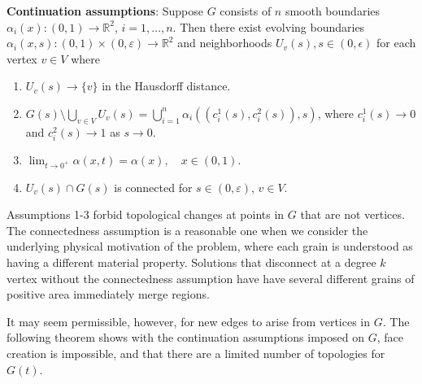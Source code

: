  \textbf{Continuation assumptions}: Suppose $G$ consists of $n$ smooth boundaries  $\alpha_{i}(x):(0,1) \rightarrow \mathbb{R}^2$, $i = 1, \dots, n$. Then   there exist evolving boundaries $\alpha_i(x,s):(0,1)\times (0,\varepsilon)\rightarrow \mathbb R^2$ and neighborhoods $U_v(s), s\in (0,\epsilon)  $ for each vertex  $v \in V$ where 
\begin{enumerate}
\item $U_v(s) \rightarrow \{v\}$ in the Hausdorff distance.
\item $G(s) \setminus \bigcup_{v\in V} U_v(s)= \bigcup_{i = 1}^n \alpha_i((c_i^1(s),c_i^2(s)),s)$, where $c_i^1(s) \rightarrow 0$ and $c_i^2(s) \rightarrow 1$ as $s\rightarrow 0$. 
\item 
$\lim_{t\rightarrow 0^+} \alpha(x,t) = \alpha(x), \quad x \in (0,1)$.
\item
  $U_v(s)\cap G(s)$ is connected for $s \in (0, \varepsilon)$, $v\in V$.


\end{enumerate}
Assumptions 1-3 forbid topological changes  at points in $G$ that are not vertices. The connectedness assumption is a reasonable one when we consider the underlying physical motivation of the problem, where each grain is understood as having a different material property.  Solutions that disconnect at a degree $k$ vertex without the connectedness assumption have have several different grains of positive area immediately merge regions. 


It may seem permissible, however, for new edges to arise from vertices in $G$. The following theorem shows with the continuation assumptions imposed on $G$, face creation is impossible, and that there are a limited number of topologies for $G(t)$. 

